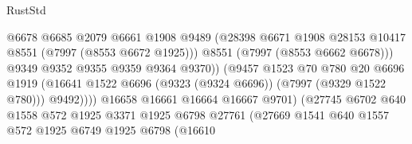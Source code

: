 \begin{lexlean}{RustStd}
\begin{coremodule}
{\begin{coremodule}
{{{{{{{{{{{{{{{{{{{{{{{{{{{{{{{{{{{{{{{{{{{                                          @6678
                                          @6685
                                          @2079
                                          @6661
                                          @1908
                                          @9489
                                          (@28398
                                            @6671
                                            @1908
                                            @28153
                                            @10417
                                            @8551
                                            (@7997 (@8553 @6672 @1925)))
                                          @8551
                                          (@7997 (@8553 @6662 @6678)))
                                        @9349
                                        @9352
                                        @9355
                                        @9359
                                        @9364
                                        @9370))
                                    (@9457
                                      @1523
                                      @70
                                      @780
                                      @20
                                      @6696
                                      @1919
                                      (@16641
                                        @1522
                                        @6696
                                        (@9323 (@9324 @6696))
                                        (@7997 (@9329 @1522 @780)))
                                      @9492))))
                              @16658
                              @16661
                              @16664
                              @16667
                              @9701)
                            (@27745
                              @6702
                              @640
                              @1558
                              @572
                              @1925
                              @3371
                              @1925
                              @6798
                              @27761
                              (@27669
                                @1541
                                @640
                                @1557
                                @572
                                @1925
                                @6749
                                @1925
                                @6798
                                (@16610
}}}}}}}}}}}}}}}}}}}}}}}}}}}}}}}}}}}}}}}}}}}
\end{coremodule}}
\end{coremodule}
\end{lexlean}
